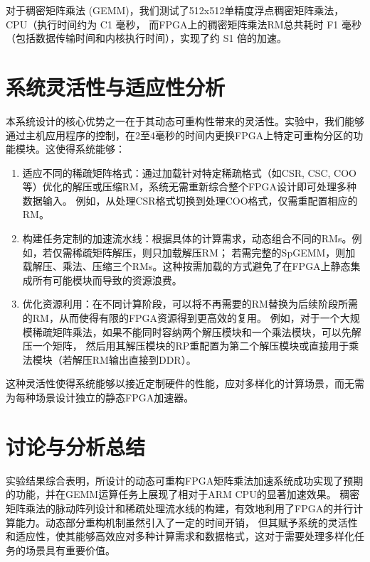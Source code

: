 对于稠密矩阵乘法 (GEMM)，我们测试了512x512单精度浮点稠密矩阵乘法，CPU（执行时间约为 C1 毫秒，
而FPGA上的稠密矩阵乘法RM总共耗时 F1 毫秒（包括数据传输时间和内核执行时间），实现了约 S1 倍的加速。

\section{系统灵活性与适应性分析}

本系统设计的核心优势之一在于其动态可重构性带来的灵活性。实验中，我们能够通过主机应用程序的控制，在2至4毫秒的时间内更换FPGA上特定可重构分区的功能模块。这使得系统能够：
\begin{enumerate}
    \item 适应不同的稀疏矩阵格式：通过加载针对特定稀疏格式（如CSR, CSC, COO等）优化的解压或压缩RM，系统无需重新综合整个FPGA设计即可处理多种数据输入。
    例如，从处理CSR格式切换到处理COO格式，仅需重配置相应的RM。
    \item 构建任务定制的加速流水线：根据具体的计算需求，动态组合不同的RMs。例如，若仅需稀疏矩阵解压，则只加载解压RM；
    若需完整的SpGEMM，则加载解压、乘法、压缩三个RMs。这种按需加载的方式避免了在FPGA上静态集成所有可能模块而导致的资源浪费。
    \item 优化资源利用：在不同计算阶段，可以将不再需要的RM替换为后续阶段所需的RM，从而使得有限的FPGA资源得到更高效的复用。
    例如，对于一个大规模稀疏矩阵乘法，如果不能同时容纳两个解压模块和一个乘法模块，可以先解压一个矩阵，
    然后用其解压模块的RP重配置为第二个解压模块或直接用于乘法模块（若解压RM输出直接到DDR）。
\end{enumerate}

这种灵活性使得系统能够以接近定制硬件的性能，应对多样化的计算场景，而无需为每种场景设计独立的静态FPGA加速器。

\section{讨论与分析总结}

实验结果综合表明，所设计的动态可重构FPGA矩阵乘法加速系统成功实现了预期的功能，并在GEMM运算任务上展现了相对于ARM CPU的显著加速效果。
稠密矩阵乘法的脉动阵列设计和稀疏处理流水线的构建，有效地利用了FPGA的并行计算能力。动态部分重构机制虽然引入了一定的时间开销，
但其赋予系统的灵活性和适应性，使其能够高效应对多种计算需求和数据格式，这对于需要处理多样化任务的场景具有重要价值。
